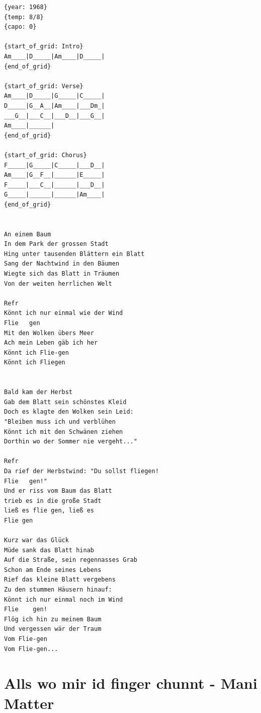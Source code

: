 \documentclass[
]{book}
\let\stdsection\section
\renewcommand\section{\clearpage\stdsection}
\begin{document}
\begin{verbatim}
{year: 1968}
{temp: 8/8}
{capo: 0}

{start_of_grid: Intro}
Am____|D_____|Am____|D_____|
{end_of_grid}

{start_of_grid: Verse}
Am____|D_____|G_____|C_____|
D_____|G__A__|Am____|___Dm_|
___G__|___C__|___D__|___G__|
Am____|______|
{end_of_grid}

{start_of_grid: Chorus}
F_____|G_____|C_____|___D__|
Am____|G__F__|______|E_____|
F_____|___C__|______|___D__|
G_____|______|______|Am____|
{end_of_grid}


An einem Baum
In dem Park der grossen Stadt
Hing unter tausenden Blättern ein Blatt
Sang der Nachtwind in den Bäumen
Wiegte sich das Blatt in Träumen
Von der weiten herrlichen Welt

Refr
Könnt ich nur einmal wie der Wind
Flie   gen
Mit den Wolken übers Meer
Ach mein Leben gäb ich her
Könnt ich Flie-gen
Könnt ich Fliegen


Bald kam der Herbst
Gab dem Blatt sein schönstes Kleid
Doch es klagte den Wolken sein Leid:
"Bleiben muss ich und verblühen
Könnt ich mit den Schwänen ziehen
Dorthin wo der Sommer nie vergeht..."

Refr
Da rief der Herbstwind: "Du sollst fliegen! 
Flie   gen!"
Und er riss vom Baum das Blatt
trieb es in die große Stadt
ließ es flie gen, ließ es
Flie gen
 
Kurz war das Glück
Müde sank das Blatt hinab
Auf die Straße, sein regennasses Grab
Schon am Ende seines Lebens
Rief das kleine Blatt vergebens
Zu den stummen Häusern hinauf:
Könnt ich nur einmal noch im Wind
Flie    gen!
Flög ich hin zu meinem Baum
Und vergessen wär der Traum
Vom Flie-gen
Vom Flie-gen...
\end{verbatim}

\hypertarget{alls-wo-mir-id-finger-chunnt---mani-matter}{%
\section{Alls wo mir id finger chunnt - Mani Matter}\label{alls-wo-mir-id-finger-chunnt---mani-matter}}
\end{document}
